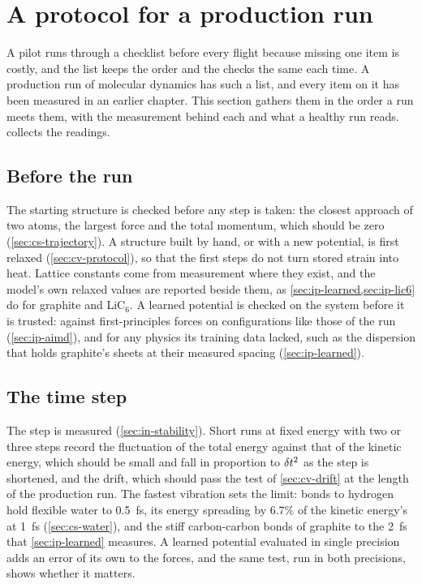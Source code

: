 \section{A protocol for a production run}
\label{sec:ip-protocol}

A pilot runs through a checklist before every flight because missing one
item is costly, and the list keeps the order and the checks the same each
time. A production run of molecular
dynamics has such a list, and every item on it has been measured in an
earlier chapter. This section gathers them in the order a run meets them,
with the measurement behind each and what a healthy run reads.
 collects the readings.

\subsection*{Before the run}

The starting structure is checked before any step is taken: the closest
approach of two atoms, the largest force and the total momentum, which
should be zero (\cref{sec:cs-trajectory}). A structure built by hand, or
with a new potential, is first relaxed (\cref{sec:cv-protocol}), so that the
first steps do not turn stored strain into heat. Lattice constants come
from measurement where they exist, and the model's own relaxed values are
reported beside them, as \cref{sec:ip-learned,sec:ip-lic6} do for
graphite and LiC$_6$.
A learned potential is checked on the system before it is trusted:
against first-principles forces on configurations like those of the run
(\cref{sec:ip-aimd}), and for any physics its training data lacked, such
as the dispersion that holds graphite's sheets at their measured
spacing (\cref{sec:ip-learned}).

\subsection*{The time step}

The step is measured (\cref{sec:in-stability}). Short runs at fixed
energy with two or three steps record the fluctuation of the total
energy against that of the kinetic energy, which should be small and fall
in proportion to $\delta t^2$ as the step is shortened, and the drift, which
should pass the test of \cref{sec:cv-drift} at the length of the
production run. The fastest vibration sets the limit: bonds to hydrogen
hold flexible water to \SI{0.5}{\femto\second}, its energy spreading by
6.7\% of the kinetic energy's at \SI{1}{\femto\second} (\cref{sec:cs-water}),
and the stiff
carbon-carbon bonds of graphite to the \SI{2}{\femto\second} that
\cref{sec:ip-learned} measures. A learned potential evaluated in single
precision adds an error of its own to the forces, and the same test, run
in both precisions, shows whether it matters.

